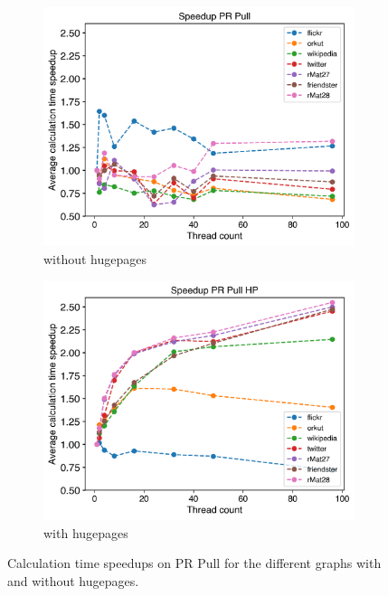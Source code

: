 \begin{figure}
	\hfil
	\begin{subfigure}{0.4\textwidth}
		\includegraphics[width=\linewidth]{../../plots/singleNodePRPullGaloisThreads.png}
		\caption{without hugepages}
		\label{fig:galoisSpeedupPRPull_noHP}
	\end{subfigure}
	\begin{subfigure}{0.4\textwidth}
		\includegraphics[width=\linewidth]{../../plots/singleNodePRPullGaloisHPThreads.png}
		\caption{with hugepages}
		\label{fig:galoisSpeedupPRPull_HP}
	\end{subfigure}
	\hfil
	\caption{Calculation time speedups on PR Pull for the different graphs with and without hugepages.}
	\label{fig:galoisSpeedupPRPull}
\end{figure}








